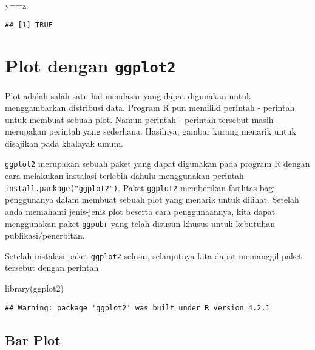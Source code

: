 \documentclass[
]{book}
\newenvironment{Shaded}{\begin{snugshade}}{\end{snugshade}}
\newcommand{\FunctionTok}[1]{\textcolor[rgb]{0.00,0.00,0.00}{#1}}
\newcommand{\NormalTok}[1]{#1}
\newcommand{\SpecialCharTok}[1]{\textcolor[rgb]{0.00,0.00,0.00}{#1}}
\begin{document}
\begin{Shaded}
\begin{Highlighting}[]
\NormalTok{y}\SpecialCharTok{==}\NormalTok{z}
\end{Highlighting}
\end{Shaded}

\begin{verbatim}
## [1] TRUE
\end{verbatim}

\hypertarget{plot-dengan-ggplot2}{%
\chapter{\texorpdfstring{Plot dengan \texttt{ggplot2}}{Plot dengan ggplot2}}\label{plot-dengan-ggplot2}}

Plot adalah salah satu hal mendasar yang dapat digunakan untuk menggambarkan distribusi data. Program R pun memiliki perintah - perintah untuk membuat sebuah plot. Namun perintah - perintah tersebut masih merupakan perintah yang sederhana. Hasilnya, gambar kurang menarik untuk disajikan pada khalayak umum.

\texttt{ggplot2} merupakan sebuah paket yang dapat digunakan pada program R dengan cara melakukan instalasi terlebih dahulu menggunakan perintah \texttt{install.package("ggplot2")}. Paket \texttt{ggplot2} memberikan fasilitas bagi penggunanya dalam membuat sebuah plot yang menarik untuk dilihat. Setelah anda memahami jenis-jenis plot beserta cara penggunaannya, kita dapat menggunakan paket \texttt{ggpubr} yang telah disusun khusus untuk kebutuhan publikasi/penerbitan.

Setelah instalasi paket \texttt{ggplot2} selesai, selanjutnya kita dapat memanggil paket tersebut dengan perintah

\begin{Shaded}
\begin{Highlighting}[]
\FunctionTok{library}\NormalTok{(ggplot2)}
\end{Highlighting}
\end{Shaded}

\begin{verbatim}
## Warning: package 'ggplot2' was built under R version 4.2.1
\end{verbatim}

\hypertarget{bar-plot}{%
\section{Bar Plot}\label{bar-plot}}
\end{document}
